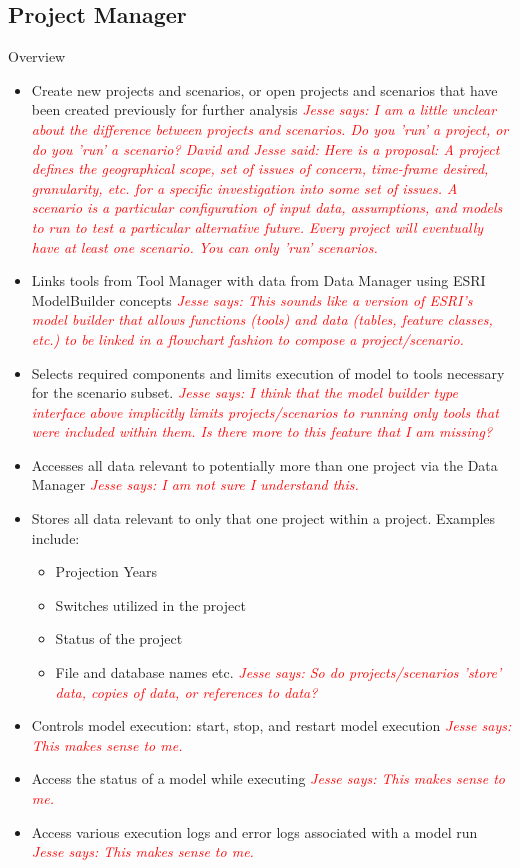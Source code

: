 \documentclass[titlepage]{article}
\begin{document}
\subsection{Project Manager}

Overview

\begin{itemize}
	\item Create new projects and scenarios, or open projects and scenarios that have been created previously for further analysis
		\textcolor{red}{\textit{Jesse says: I am a little unclear about the difference between projects and scenarios.  Do you 'run' a project, or do you 'run' a scenario?  David and Jesse said: Here is a proposal: A project defines the geographical scope, set of issues of concern, time-frame desired, granularity, etc. for a specific investigation into some set of issues.  A scenario is a particular configuration of input data, assumptions, and models to run to test a particular alternative future.  Every project will eventually have at least one scenario.  You can only 'run' scenarios.}}
	\item Links tools from Tool Manager with data from Data Manager using ESRI ModelBuilder concepts
		\textcolor{red}{\textit{Jesse says: This sounds like a version of ESRI's model builder that allows functions (tools) and data (tables, feature classes, etc.) to be linked in a flowchart fashion to compose a project/scenario.}}
	\item Selects required components and limits execution of model to tools necessary for the scenario subset.
		\textcolor{red}{\textit{Jesse says: I think that the model builder type interface above implicitly limits projects/scenarios to running only tools that were included within them.  Is there more to this feature that I am missing?}}
	\item Accesses all data relevant to potentially more than one project via the Data Manager
		\textcolor{red}{\textit{Jesse says: I am not sure I understand this.}}
	\item Stores all data relevant to only that one project within a project. Examples include:
		\begin{itemize}
			\item Projection Years
			\item Switches utilized in the project
			\item Status of the project
			\item File and database names etc.
				\textcolor{red}{\textit{Jesse says: So do projects/scenarios 'store' data, copies of data, or references to data?}}
		\end{itemize}
	\item Controls model execution: start, stop, and restart model execution
		\textcolor{red}{\textit{Jesse says: This makes sense to me.}}
	\item Access the status of a model while executing
		\textcolor{red}{\textit{Jesse says: This makes sense to me.}}
	\item Access various execution logs and error logs associated with a model run
		\textcolor{red}{\textit{Jesse says: This makes sense to me.}}
\end{itemize}
\end{document}
